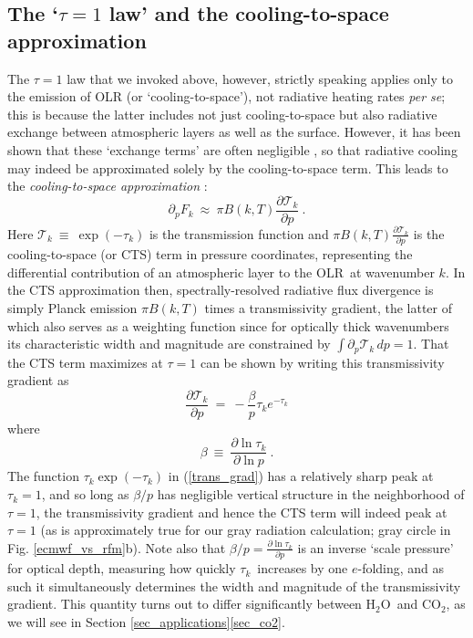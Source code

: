 \documentclass{ametsoc}
\newcommand{\beqn}{\begin{equation}}
\newcommand{\eeqn}{\end{equation}}
\newcommand{\eqnref}[1]{(\ref{#1})}
\newcommand{\partialder}[2]{\ensuremath{\frac{\partial #1}{\partial #2}}}
\newcommand{\ppp}{\ensuremath{\partial_p}}
\newcommand{\cotwo}{\ensuremath{\mathrm{CO_2}}}
\newcommand{\htwo}{\ensuremath{\mathrm{H_2O}}}
\newcommand{\OLR}{\ensuremath{\mathrm{OLR}}}
\newcommand{\trans}{\ensuremath{\mathcal{T}}}
\newcommand{\tauk}{\ensuremath{\tau_k}}
\begin{document}
\subsection{The `$\tau=1$ law' and the cooling-to-space approximation} \label{sec_tau=1}
The $\tau=1$ law that we invoked above, however, strictly speaking applies only to the emission of OLR (or `cooling-to-space'), not radiative heating rates \emph{per se}; this is because  the latter includes not just cooling-to-space but also radiative exchange between atmospheric layers as well as the surface. However, it has been shown that these `exchange terms' are often negligible \citep{clough1992,rodgers1966}, so that radiative cooling may indeed be approximated solely by the cooling-to-space term. This leads to the  \emph{cooling-to-space approximation} \citep[e.g.][section 10.4]{petty2006}:  
\beqn
	\ppp F_k \ \approx \   \pi B(k,T) \partialder{\trans_k}{p} \  .
	\label{cts}
\eeqn
Here $\trans_k \ \equiv \ \exp(-\tauk)$ is the transmission function and $\pi B(k,T) \partialder{\trans_k}{p}$ is the cooling-to-space (or CTS) term in pressure coordinates, representing the differential contribution of an atmospheric layer to the \OLR\ at wavenumber $k$. In the CTS approximation then, spectrally-resolved radiative flux divergence is  simply Planck emission $\pi B(k,T)$ times a transmissivity gradient, the latter of which also serves as a weighting function since for optically thick wavenumbers its characteristic width and magnitude are constrained by $\int\ppp\trans_k \, dp = 1$. That the CTS term  maximizes at $\tau=1$ can be shown by  writing this transmissivity gradient as 
 \beqn
 		\partialder{\trans_k}{p} \  =  \ -\frac{\beta}{p} \tauk e^{-\tauk} 
		 \label{trans_grad} 
\eeqn
where
\beqn
		\beta \  \equiv  \ \partialder{\ln \tauk}{\ln p} \ . 
		\label{beta_def}
\eeqn
 The function $\tauk \exp(-\tauk)$ in \eqnref{trans_grad} has a relatively sharp peak at $\tauk=1$, and so long as $\beta/p$  has negligible vertical structure in the neighborhood of $\tau=1$, the transmissivity gradient and hence the CTS term will indeed peak at $\tau=1$ (as is approximately true for our gray radiation calculation; gray circle in Fig. \ref{ecmwf_vs_rfm}b). Note also that $\beta/p=\partialder{\ln\tauk}{p}$ is an inverse  `scale pressure' for optical depth, measuring how quickly \tauk\ increases by one $e$-folding, and as such  it simultaneously determines the width and magnitude of the transmissivity gradient. This quantity turns out to differ significantly between \htwo\ and \cotwo, as we will see in Section \ref{sec_applications}\ref{sec_co2}. 
 
\end{document}
